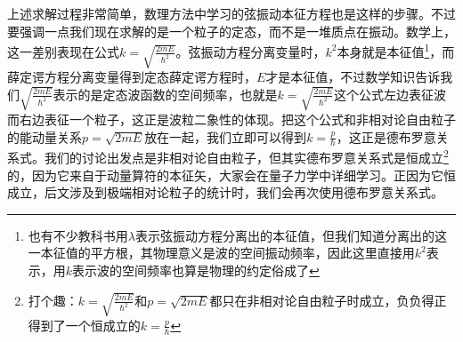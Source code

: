 \documentclass[../../main.tex]{subfiles}
\begin{document}
\begin{example}
\begin{solution}
    上述求解过程非常简单，数理方法中学习的弦振动本征方程也是这样的步骤。不过要强调一点我们现在求解的是一个粒子的定态，而不是一堆质点在振动。数学上，这一差别表现在公式\(k=\sqrt{\frac{2mE}{\hbar^2}}\)。弦振动方程分离变量时，\(k^2\)本身就是本征值\footnote{也有不少教科书用\(\lambda\)表示弦振动方程分离出的本征值，但我们知道分离出的这一本征值的平方根，其物理意义是波的空间振动频率，因此这里直接用\(k^2\)表示，用\(k\)表示波的空间频率也算是物理的约定俗成了}，而薛定谔方程分离变量得到定态薛定谔方程时，\(E\)才是本征值，不过数学知识告诉我们\(\sqrt{\frac{2mE}{\hbar^2}}\)表示的是定态波函数的空间频率，也就是\(k=\sqrt{\frac{2mE}{\hbar^2}}\)这个公式左边表征波而右边表征一个粒子，这正是波粒二象性的体现。把这个公式和非相对论自由粒子的能动量关系\(p=\sqrt{2mE}\)放在一起，我们立即可以得到\(k=\frac{p}{\hbar}\)，这正是德布罗意关系式。我们的讨论出发点是非相对论自由粒子，但其实德布罗意关系式是恒成立\footnote{打个趣：\(k=\sqrt{\frac{2mE}{\hbar^2}}\)和\(p=\sqrt{2mE}\)都只在非相对论自由粒子时成立，负负得正得到了一个恒成立的\(k=\frac{p}{\hbar}\)}的，因为它来自于动量算符的本征矢，大家会在量子力学中详细学习。正因为它恒成立，后文涉及到极端相对论粒子的统计时，我们会再次使用德布罗意关系式。


\end{solution}
\end{example}
\end{document}
